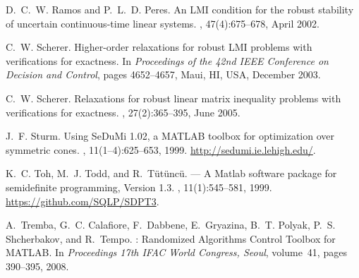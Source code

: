 \documentclass[english,11pt]{article}
\theoremstyle{break} \theorembodyfont{\small\rm}
\begin{document}
\begin{thebibliography}{10}
D.~C.~W. Ramos and P.~L.~D. Peres.
\newblock An {LMI} condition for the robust stability of uncertain
  continuous-time linear systems.
, 47(4):675--678, April
  2002.

C.~W. Scherer.
\newblock Higher-order relaxations for robust {LMI} problems with verifications
  for exactness.
\newblock In {\em Proceedings of the 42nd IEEE Conference on Decision and
  Control}, pages 4652--4657, Maui, HI, USA, December 2003.

C.~W. Scherer.
\newblock Relaxations for robust linear matrix inequality problems with
  verifications for exactness.
,
  27(2):365--395, June 2005.

J.~F. Sturm.
\newblock Using {S}e{D}u{M}i {1.02}, a {MATLAB} toolbox for optimization over
  symmetric cones.
, 11(1--4):625--653, 1999.
\newblock \url{http://sedumi.ie.lehigh.edu/}.

K.~C. Toh, M.~J. Todd, and R.~{T\"{u}t\"{u}nc\"{u}}.
 --- {A} {M}atlab software package for semidefinite
  programming, {V}ersion 1.3.
, 11(1):545--581, 1999.
\newblock \url{https://github.com/SQLP/SDPT3}.

A.~Tremba, G.~C. Calafiore, F.~Dabbene, E.~Gryazina, B.~T. Polyak, P.~S.
  Shcherbakov, and R.~Tempo.
: {R}andomized {A}lgorithms {C}ontrol {T}oolbox for {MATLAB}.
\newblock In {\em Proceedings 17th IFAC World Congress, Seoul}, volume~41,
  pages 390--395, 2008.

\end{thebibliography}
\end{document}
